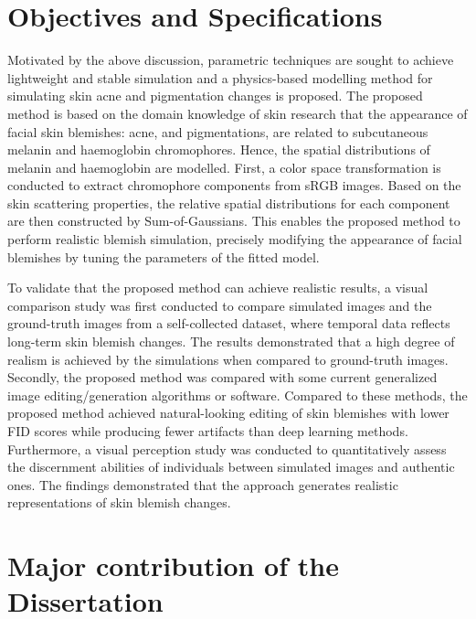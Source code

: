 \begin{spacing}{1.5}

\section{Objectives and Specifications}

Motivated by the above discussion, parametric techniques are sought to achieve lightweight and stable simulation and a physics-based modelling method for simulating skin acne and pigmentation changes is proposed. The proposed method is based on the domain knowledge of skin research that the appearance of facial skin blemishes: acne, and pigmentations, are related to subcutaneous melanin and haemoglobin chromophores. Hence, the spatial distributions of melanin and haemoglobin are modelled. First, a color space transformation is conducted to extract chromophore components from sRGB images. Based on the skin scattering properties, the relative spatial distributions for each component are then constructed by Sum-of-Gaussians. This enables the proposed method to perform realistic blemish simulation, precisely modifying the appearance of facial blemishes by tuning the parameters of the fitted model.

To validate that the proposed method can achieve realistic results, a visual comparison study was first conducted to compare simulated images and the ground-truth images from a self-collected dataset, where temporal data reflects long-term skin blemish changes. The results demonstrated that a high degree of realism is achieved by the simulations when compared to ground-truth images. Secondly, the proposed method was compared with some current generalized image editing/generation algorithms or software. Compared to these methods, the proposed method achieved natural-looking editing of skin blemishes with lower FID scores while producing fewer artifacts than deep learning methods. Furthermore, a visual perception study was conducted to quantitatively assess the discernment abilities of individuals between simulated images and authentic ones. The findings demonstrated that the approach generates realistic representations of skin blemish changes.


\section{Major contribution of the Dissertation}


\end{spacing}
